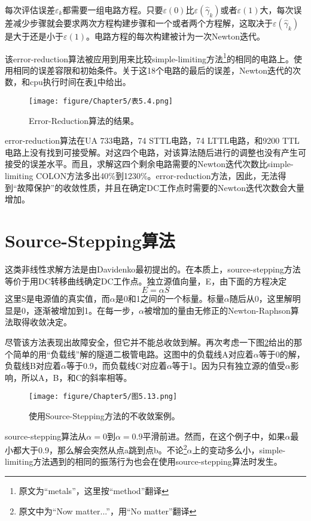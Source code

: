 每次评估误差$\varepsilon_k$都需要一组电路方程。只要$\varepsilon(0)$比$\varepsilon(\hat{\gamma}_k)$或者$\varepsilon(1)$大，每次误差减少步骤就会要求两次方程构建步骤和一个或者两个方程解，这取决于$\varepsilon(\hat{\gamma}_k)$是大于还是小于$\varepsilon(1)$。电路方程的每次构建被计为一次Newton迭代。

该error-reduction算法被应用到用来比较simple-limiting方法\footnote{原文为“metals”，这里按“method”翻译}的相同的电路上。使用相同的误差容限和初始条件。关于这18个电路的最后的误差，Newton迭代的次数，和cpu执行时间在表\ref{表5.4}中给出。
\begin{figure}[htbp]
\small
    \centering
    \texttt{[image: figure/Chapter5/表5.4.png]}
    \caption{Error-Reduction算法的结果。}
    \label{表5.4}
\end{figure}

error-reduction算法在UA 733电路，74 STTL电路，74 LTTL电路，和9200 TTL电路上没有找到可接受解。对这四个电路，对该算法随后进行的调整也没有产生可接受的误差水平。而且，求解这四个剩余电路需要的Newton迭代次数比simple-limiting COLON方法多出40\%到1230\%。error-reduction方法，因此，无法得到“故障保护”的收敛性质，并且在确定DC工作点时需要的Newton迭代次数会大量增加。

\section{Source-Stepping算法}
这类非线性求解方法是由Davidenko\cite{ref-60}最初提出的。在本质上，source-stepping方法等价于用DC转移曲线确定DC工作点。独立源值向量，E，由下面的方程决定
\begin{equation}
    E = \alpha S
    \label{eq:5.29}
\end{equation}
这里S是电源值的真实值，而$\alpha$是0和1之间的一个标量。标量$\alpha$随后从0，这里解明显是0，逐渐被增加到1。在每一步，$\alpha$被增加的量由无修正的Newton-Raphson算法取得收敛决定。

尽管该方法表现出故障安全，但它并不能总收敛到解。再次考虑一下图\ref{图5.13}给出的那个简单的用“负载线”解的隧道二极管电路。这图中的负载线A对应着$\alpha$等于0的解，负载线B对应着$\alpha$等于0.9，而负载线C对应着$\alpha$等于1。因为只有独立源的值受$\alpha$影响，所以A，B，和C的斜率相等。
\begin{figure}[htbp]
\small
    \centering
    \texttt{[image: figure/Chapter5/图5.13.png]}
    \caption{使用Source-Stepping方法的不收敛案例。}
    \label{图5.13}
\end{figure}

source-stepping算法从$\alpha=0$到$\alpha=0.9$平滑前进。然而，在这个例子中，如果$\alpha$最小都大于0.9，那么解会突然从点a跳到点b。不论\footnote{原文中为“Now matter...”，用“No matter”翻译}$\alpha$上的变动多么小，simple-limiting方法遇到的相同的振荡行为也会在使用source-stepping算法时发生。

